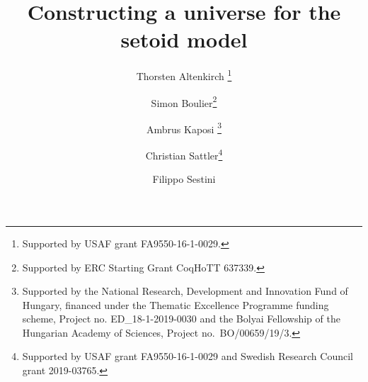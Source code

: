 \documentclass[autoref]{llncs}
\begin{document}
\title{Constructing a universe for the setoid model}


\author{Thorsten Altenkirch
  \thanks{Supported by USAF grant FA9550-16-1-0029.}
   \and
  Simon Boulier\thanks{Supported by ERC Starting Grant CoqHoTT 637339.} \and
  Ambrus Kaposi
  \thanks{Supported by the National Research, Development and Innovation Fund of Hungary, financed under the Thematic Excellence Programme funding scheme, Project no. ED\_18-1-2019-0030 and the Bolyai Fellowship of the Hungarian Academy of Sciences, Project no.\ BO/00659/19/3.}\and
  Christian Sattler\thanks{Supported by USAF grant FA9550-16-1-0029 and Swedish Research Council grant 2019-03765.} \and
  Filippo Sestini}



\maketitle              %
\end{document}
